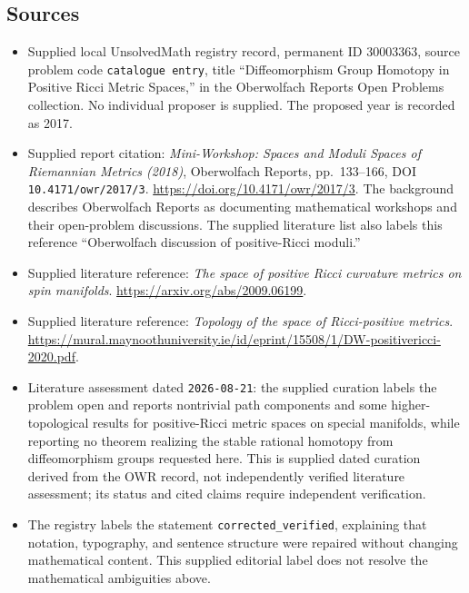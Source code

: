 \documentclass[11pt]{article}
\begin{document}
\subsection{Sources}
\begin{itemize}
\item Supplied local UnsolvedMath registry record, permanent ID \(30003363\), source problem code \texttt{catalogue entry}, title ``Diffeomorphism Group Homotopy in Positive Ricci Metric Spaces,'' in the Oberwolfach Reports Open Problems collection. No individual proposer is supplied. The proposed year is recorded as 2017.
\item Supplied report citation: \emph{Mini-Workshop: Spaces and Moduli Spaces of Riemannian Metrics (2018)}, Oberwolfach Reports, pp.\ 133--166, DOI \texttt{10.4171/owr/2017/3}. \url{https://doi.org/10.4171/owr/2017/3}. The background describes Oberwolfach Reports as documenting mathematical workshops and their open-problem discussions. The supplied literature list also labels this reference ``Oberwolfach discussion of positive-Ricci moduli.''
\item Supplied literature reference: \emph{The space of positive Ricci curvature metrics on spin manifolds}. \url{https://arxiv.org/abs/2009.06199}.
\item Supplied literature reference: \emph{Topology of the space of Ricci-positive metrics}. \url{https://mural.maynoothuniversity.ie/id/eprint/15508/1/DW-positivericci-2020.pdf}.
\item Literature assessment dated \texttt{2026-08-21}: the supplied curation labels the problem open and reports nontrivial path components and some higher-topological results for positive-Ricci metric spaces on special manifolds, while reporting no theorem realizing the stable rational homotopy from diffeomorphism groups requested here. This is supplied dated curation derived from the OWR record, not independently verified literature assessment; its status and cited claims require independent verification.
\item The registry labels the statement \texttt{corrected\_verified}, explaining that notation, typography, and sentence structure were repaired without changing mathematical content. This supplied editorial label does not resolve the mathematical ambiguities above.
\end{itemize}
\end{document}
